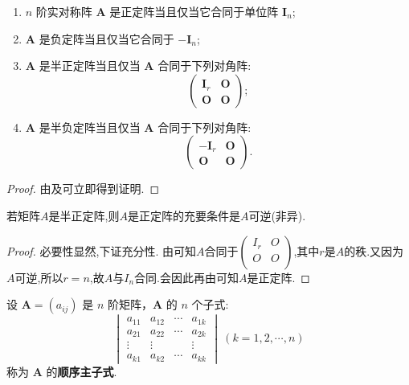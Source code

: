 \documentclass[../../main.tex]{subfiles}%
\begin{document}
\begin{theorem}[(半)正定/负定阵的合同标准型]\label{theorem:正定矩阵的充要条件}
\begin{enumerate}[(1)]
\item $n$ 阶实对称阵 $\boldsymbol{A}$ 是正定阵当且仅当它合同于单位阵 $\boldsymbol{I}_n$;

\item $\boldsymbol{A}$ 是负定阵当且仅当它合同于 $-\boldsymbol{I}_n$;

\item $\boldsymbol{A}$ 是半正定阵当且仅当 $\boldsymbol{A}$ 合同于下列对角阵:
\[
\begin{pmatrix}
\boldsymbol{I}_r & \boldsymbol{O}\\
\boldsymbol{O} & \boldsymbol{O}
\end{pmatrix};
\]

\item $\boldsymbol{A}$ 是半负定阵当且仅当 $\boldsymbol{A}$ 合同于下列对角阵:
\[
\begin{pmatrix}
-\boldsymbol{I}_r & \boldsymbol{O}\\
\boldsymbol{O} & \boldsymbol{O}
\end{pmatrix}.
\] 
\end{enumerate}
\end{theorem}
\begin{proof}

由及可立即得到证明.

\end{proof}

\begin{corollary}\label{corollary:可逆的半正定阵必是正定阵}
若矩阵$A$是半正定阵,则$A$是正定阵的充要条件是$A$可逆(非异).
\end{corollary}
\begin{proof}

必要性显然,下证充分性.
由可知$A$合同于$\left( \begin{matrix}
I_r&		O\\
O&		O\\
\end{matrix} \right) $,其中$r$是$A$的秩.又因为$A$可逆,所以$r=n$,故$A$与$I_n$合同.会因此再由可知$A$是正定阵.

\end{proof}

\begin{definition}[顺序主子式]
设 $\boldsymbol{A}=(a_{ij})$ 是 $n$ 阶矩阵，$\boldsymbol{A}$ 的 $n$ 个子式:
\[
\begin{vmatrix}
a_{11} & a_{12} & \cdots & a_{1k}\\
a_{21} & a_{22} & \cdots & a_{2k}\\
\vdots & \vdots & & \vdots\\
a_{k1} & a_{k2} & \cdots & a_{kk}
\end{vmatrix}\ (k = 1,2,\cdots,n)
\]
称为 $\boldsymbol{A}$ 的\textbf{顺序主子式}.
\end{definition}
\end{document}

